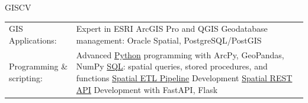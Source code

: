 \documentclass[letterpaper]{article}
\newenvironment{skillslist}
        {
            \hspace*{-0.07in}\begin{tabular}[t]{ l L{5.17in} }
        }{
            \end{tabular}
        }
\newcommand{\impt}[1]{\uline{#1}}
\begin{document}
    \begin{taggedblock}{GISCV}
        \begin{skillslist}
            GIS Applications:&
                Expert in ESRI ArcGIS Pro and QGIS \linebreak
                Geodatabase management: Oracle Spatial, PostgreSQL/PostGIS \linebreak
                \\
            Programming \& scripting:&
                Advanced \impt{Python} programming with ArcPy, GeoPandas, NumPy \linebreak
                \impt{SQL}: spatial queries, stored procedures, and functions \linebreak
                \impt{Spatial ETL Pipeline} Development\linebreak
                \impt{Spatial REST API} Development with FastAPI, Flask \linebreak
                \\

\end{skillslist}
\end{taggedblock}
\end{document}
